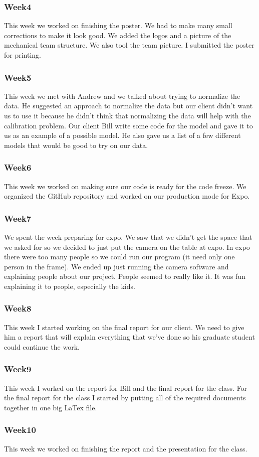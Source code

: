 \subsubsection*{Week4}
	This week we worked on finishing the poster. We had to make many small corrections  to make it look good. We added the logos and a picture of the mechanical team structure. We also tool the team picture. I submitted the poster for printing. 
	
\subsubsection*{Week5}
	This week we met with Andrew and we talked about trying to normalize the data. He suggested an approach to normalize the data but our client didn't want us to use it because he didn't think that normalizing the data will help with the calibration problem. Our client Bill write some code for the model and gave it to us as an example of a possible model. He also gave us a list of a few different models that would be good to try on our data.  
\subsubsection*{Week6}
	This week we worked on making sure our code is ready for the code freeze. We organized the GitHub repository and worked on our production mode for Expo. 

\subsubsection*{Week7}
	We spent the week preparing for expo. We saw that we didn't get the space that we asked for so we decided to just put the camera on the table at expo. In expo there were too many people so we could run our program (it need only one person in the frame). We ended up just running the camera software and explaining people about our project. People seemed to really like it. It was fun explaining it to people, especially the kids. 
\subsubsection*{Week8}
	This week I started working on the final report for our client. We need to give him a report that will explain everything that we've done so his graduate student could continue the work. 
\subsubsection*{Week9}
	This week I worked on the report for Bill  and the final report for the class. For the final report for the class I started by putting all of the required documents together in one big LaTex file. 
\subsubsection*{Week10}
	This week we worked on finishing the report and the presentation for the class. 